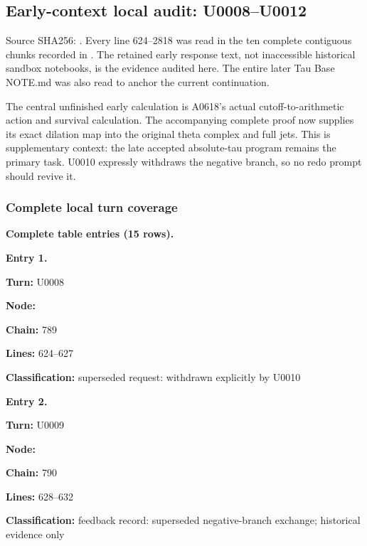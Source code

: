 \subsection{Early-context local audit:
U0008--U0012}\label{TranscriptLedgerStage:early-context-local-audit-u0008u0012}

Source SHA256:
\protect{}.
Every line 624--2818 was read in the ten complete contiguous chunks
recorded in \protect{}. The retained early response
text, not inaccessible historical sandbox notebooks, is the evidence
audited here. The entire later Tau Base NOTE.md was also read to anchor
the current continuation.

The central unfinished early calculation is A0618's actual
cutoff-to-arithmetic action and survival calculation. The accompanying
complete proof now supplies its exact dilation map into the original
theta complex and full jets. This is supplementary context: the late
accepted absolute-tau program remains the primary task. U0010 expressly
withdraws the negative branch, so no redo prompt should revive it.

\subsubsection{Complete local turn
coverage}\label{TranscriptLedgerStage:complete-local-turn-coverage}

\textbf{Complete table entries (15 rows).}


\textbf{Entry 1.}

\textbf{Turn:} U0008

\textbf{Node:} \protect{}

\textbf{Chain:} 789

\textbf{Lines:} 624--627

\textbf{Classification:} superseded request: withdrawn explicitly by
U0010


\textbf{Entry 2.}

\textbf{Turn:} U0009

\textbf{Node:} \protect{}

\textbf{Chain:} 790

\textbf{Lines:} 628--632

\textbf{Classification:} feedback record: superseded negative-branch
exchange; historical evidence only

